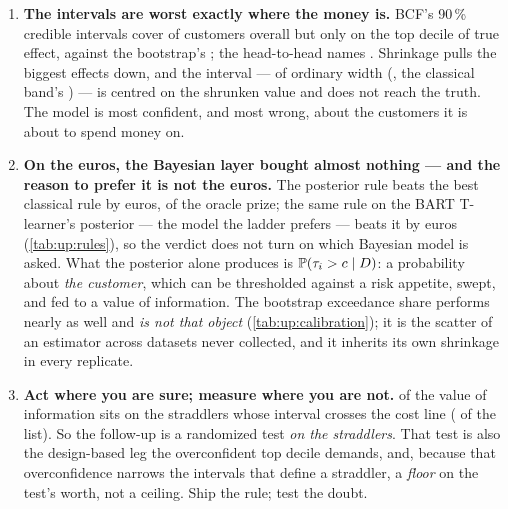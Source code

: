 \begin{enumerate}[leftmargin=*, itemsep=.45em]
  \item \textbf{The intervals are worst exactly where the money is.} BCF's 90\,\% credible intervals
        cover \pc{\nbOneBcfCovNinety} of customers overall but only \pc{\nbOneBcfTopDec} on the top
        decile of true effect, against the bootstrap's \pc{\nbOneBootTopDec}; the head-to-head names
        \nbOneHhTopdecWin. Shrinkage pulls the biggest effects down, and the interval --- of ordinary
        width (\eur{\nbOneBcfTopdecWidth}, \nbOneTopdecWidthVerdict{} the classical band's
        \eur{\nbOneBootTopdecWidth}) --- is centred on the shrunken value and does not reach the truth.
        The model is most confident, and most wrong, about the customers it is about to spend money on.

  \item \textbf{On the euros, the Bayesian layer bought almost nothing --- and the reason to prefer it
        is not the euros.} The posterior rule beats the best classical rule by \nbOneBayesEdge{} euros,
        \pc{\nbOneBayesEdgePct} of the oracle prize; the same rule on the BART T-learner's posterior ---
        the model the ladder prefers --- beats it by \nbOneBartRuleEdge{} euros (\cref{tab:up:rules}),
        so the verdict does not turn on which Bayesian model is asked. What the posterior alone
        produces is $\operatorname{\mathbb{P}}(\tau_i > c \mid D)$: a probability about \emph{the customer}, which can be
        thresholded against a risk appetite, swept, and fed to a value of information. The bootstrap
        exceedance share performs nearly as well and \emph{is not that object}
        (\cref{tab:up:calibration}); it is the scatter of an estimator across datasets never collected,
        and it inherits its own shrinkage in every replicate.

  \item \textbf{Act where you are sure; measure where you are not.} \eur{\nbOneVoiStraddlers} of the
        \eur{\nbOneVoiTotal} value of information sits on the \nbOneNStraddlers{} straddlers whose
        interval crosses the cost line (\pc{\nbOneStraddlerShare} of the list). So the follow-up is a
        randomized test \emph{on the straddlers}. That test is also the design-based leg the
        overconfident top decile demands, and, because that overconfidence narrows the intervals that
        define a straddler, a \emph{floor} on the test's worth, not a ceiling. Ship the rule; test the
        doubt.
\end{enumerate}

\clearpage
